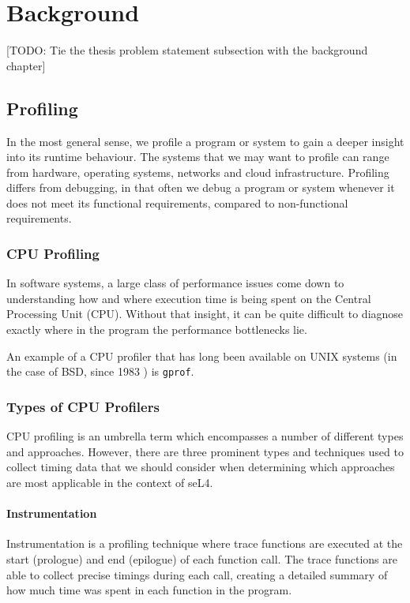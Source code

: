 \chapter{Background}\label{ch:background}

[TODO: Tie the thesis problem statement subsection with the background chapter]

\section{Profiling}

In the most general sense, we profile a program or system to gain a deeper insight into its runtime behaviour. The systems that we may want to profile can range from hardware, operating systems, networks and cloud infrastructure. Profiling differs from debugging, in that often we debug a program or system whenever it does not meet its functional requirements, compared to non-functional requirements.

\subsection{CPU Profiling}

In software systems, a large class of performance issues come down to understanding how and where execution time is being spent on the Central Processing Unit (CPU). Without that insight, it can be quite difficult to diagnose exactly where in the program the performance bottlenecks lie.

An example of a CPU profiler that has long been available on UNIX systems (in the case of BSD, since 1983 \cite{ManGprof}) is \texttt{gprof}.

\subsection{Types of CPU Profilers}\label{sect:cpu_profiler_types}

CPU profiling is an umbrella term which encompasses a number of different types and approaches. However, there are three prominent types and techniques used to collect timing data that we should consider when determining which approaches are most applicable in the context of seL4.

\subsubsection{Instrumentation}

Instrumentation is a profiling technique where trace functions are executed at the start (prologue) and end (epilogue) of each function call. The trace functions are able to collect precise timings during each call, creating a detailed summary of how much time was spent in each function in the program.

